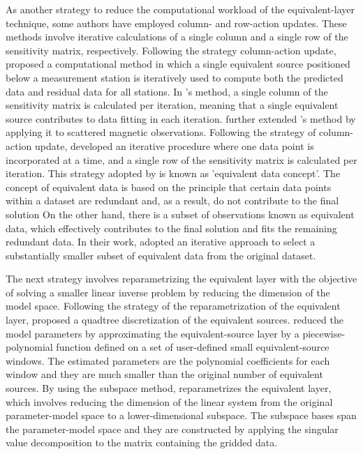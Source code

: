 As another strategy to reduce the computational workload of the equivalent-layer technique, some authors have employed column- and row-action updates. 
These methods involve iterative calculations of a single column and a single row of the sensitivity matrix, respectively.
Following the strategy column-action update, \cite{cordell1992} proposed a computational method in which a single equivalent source positioned below a measurement station is iteratively used to compute both the predicted data and residual data for all stations. 
In  \citeauthor{cordell1992}'s \citeyear{cordell1992} method, a single column of the sensitivity matrix is calculated per iteration, meaning that a single equivalent source contributes to data fitting in each iteration. 
\cite{guspi-novara2009} further extended  \citeauthor{cordell1992}'s \citeyear{cordell1992} method 
by applying it to scattered magnetic observations.
Following the strategy of column-action update, \cite{mendonca-silva1994} developed an iterative procedure where one data point is incorporated at a time, and a single row of the sensitivity matrix is calculated per iteration.
This strategy adopted by \cite{mendonca-silva1994} is known as 'equivalent data concept'.
The concept of equivalent data is based on the principle that certain data points within a dataset are redundant and, as a result, do not contribute to the final solution
On the other hand, there is a subset of observations known as equivalent data, which effectively contributes to the final solution and fits the remaining redundant data. 
In their work, \cite{mendonca-silva1994} adopted an iterative approach to select a substantially smaller subset of equivalent data from the original dataset. 


The next strategy involves reparametrizing the equivalent layer with the objective of solving a 
smaller linear inverse problem by reducing the dimension of the model space.
Following the strategy of the reparametrization of the equivalent layer, 
\cite{barnes-lumley2011} proposed a quadtree discretization of the equivalent sources.
\cite{oliveirajr-etal2013} reduced the model parameters by approximating the equivalent-source layer by a piecewise-polynomial function defined on a set of user-defined small equivalent-source windows. 
The estimated parameters are the polynomial coefficients for each window and they are much smaller than the original number of equivalent sources.
By using the subspace method, \cite{mendonca-2020} reparametrizes the equivalent layer, which involves 
reducing the dimension of the linear system from the original parameter-model space to a lower-dimensional subspace.
The subspace bases span the parameter-model space and they are constructed by applying the singular value decomposition to the matrix containing the gridded data.

